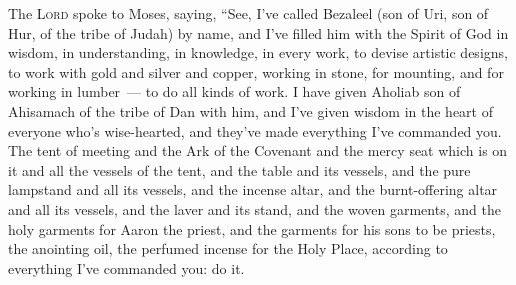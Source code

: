 
\begin{inparaenum}
     The \textsc{Lord} spoke to Moses, saying,%
     ``See, I've called Bezaleel (son of Uri, son of Hur, of the tribe of Judah) by name,%
     and I've filled him with the Spirit of God in wisdom, in understanding, in knowledge, in every work,%
     to devise artistic designs, to work with gold and silver and copper,%
     working in stone, for mounting, and for working in lumber~--- to do all kinds of work.%
     I have given Aholiab son of Ahisamach of the tribe of Dan with him, and I've given wisdom in the heart of everyone who's wise-hearted, and they've made everything I've commanded you.%
     The tent of meeting and the Ark of the Covenant and the mercy seat which is on it and all the vessels of the tent,%
     and the table and its vessels, and the pure lampstand and all its vessels, and the incense altar,%
     and the burnt-offering altar and all its vessels, and the laver and its stand,%
     and the woven garments, and the holy garments for Aaron the priest, and the garments for his sons to be priests,%
     the anointing oil, the perfumed incense for the Holy Place, according to everything I've commanded you: do it.%
    

\end{inparaenum}
